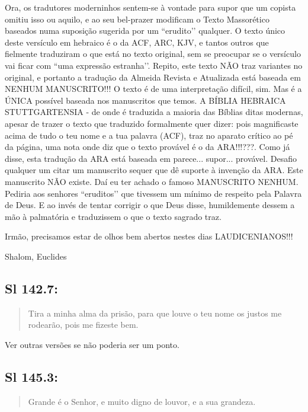 Ora, os tradutores moderninhos sentem-se à vontade para supor que um copista omitiu isso ou aquilo, e ao seu bel-prazer modificam o Texto Massorético baseados numa suposição sugerida por um ``erudito’’ qualquer. O texto único deste versículo em hebraico é o da ACF, ARC, KJV, e tantos outros que fielmente traduziram o que está no texto original, sem se preocupar se o versículo vai ficar com ``uma expressão estranha’’. Repito, este texto NÃO traz variantes no original, e portanto a tradução da Almeida Revista e Atualizada está baseada em NENHUM MANUSCRITO!!! O texto é de uma interpretação difícil, sim. Mas é a ÚNICA possível baseada nos manuscritos que temos. A BÍBLIA HEBRAICA STUTTGARTENSIA - de onde é traduzida a maioria das Bíblias ditas modernas, apesar de trazer o texto que traduzido formalmente quer dizer: pois magnificaste acima de tudo o teu nome e a tua palavra (ACF), traz no aparato crítico ao pé da página, uma nota onde diz que o texto provável é o da ARA!!!???. Como já disse, esta tradução da ARA está baseada em parece... supor... provável. Desafio qualquer um citar um manuscrito sequer que dê suporte à invenção da ARA. Este manuscrito NÃO existe. Daí eu ter achado o famoso MANUSCRITO NENHUM. Pediria aos senhores ``eruditos’’ que tivessem um mínimo de respeito pela Palavra de Deus. E ao invés de tentar corrigir o que Deus disse, humildemente dessem a mão à palmatória e traduzissem o que o texto sagrado traz.

Irmão, precisamos estar de olhos bem abertos nestes dias LAUDICENIANOS!!!

Shalom, Euclides

\subsection*{Sl 142.7:} 
 \begin{quote}
    \small
Tira a minha alma da prisão, para que louve o teu nome\uwave{;} os justos me rodearão, pois me fizeste bem.
\end{quote}

Ver outras versões se não poderia ser um ponto.

\subsection*{Sl 145.3:} 
 \begin{quote}
    \small
Grande é o Senhor, e muito digno de louvor, e a sua grandeza.
\end{quote}

